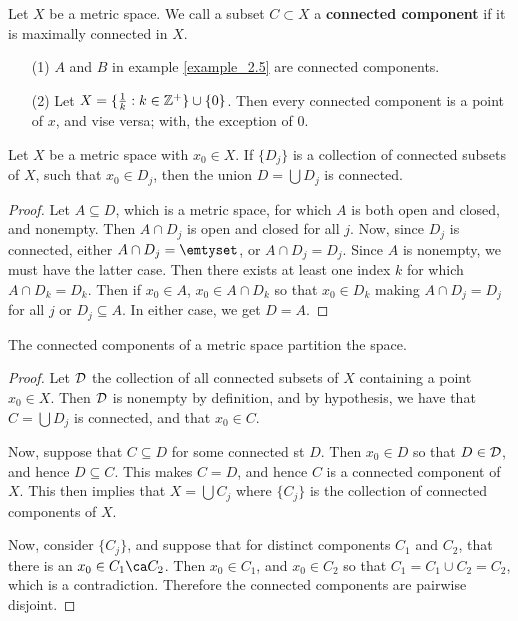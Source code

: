 \begin{definition}
    Let $X$ be a metric space. We call a subset  $C \subset X$ a
    \textbf{connected component} if it is maximally connected in $X$.
\end{definition}

\begin{example}\label{example_2.6}
    \begin{enumerate}
        \item[(1)] $A$ and  $B$ in example \ref{example_2.5} are connected
            components.

        \item[(2)] Let $X=\{\frac{1}{k} : k \in \mathbb{Z}^+\} \cup \{0\}$. Then every
            connected component is a point of $x$, and vise versa; with, the
            exception of $0$.
    \end{enumerate}
\end{example}

\begin{lemma}\label{2.2.4}
    Let $X$ be a metric space with  $x_0 \in X$. If $\{D_j\}$ is a collection of
    connected subsets of $X$, such that  $x_0 \in D_j$, then the union
    $D=\bigcup{D_j}$ is connected.
\end{lemma}
\begin{proof}
    Let $A \subseteq D$, which is a metric space, for which  $A$ is both open
    and closed, and nonempty. Then  $A \cap D_j$ is open and closed for all
    $j$. Now, since  $D_j$ is connected, either  $A \cap D_j=\emtyset$, or  $A
    \cap D_j=D_j$. Since  $A$ is nonempty, we must have the latter case. Then
    there exists at least one index $k$ for which $A \cap D_k=D_k$. Then if
    $x_0 \in A$, $x_0 \in A \cap D_k$ so that $x_0 \in D_k$ making $A \cap
    D_j=D_j$ for all  $j$ or  $D_j \subseteq A$. In either case, we get  $D=A$.
\end{proof}

\begin{theorem}\label{2.2.5}
    The connected components of a metric space partition the space.
\end{theorem}
\begin{proof}
    Let $\mathcal{D}$ the collection of all connected subsets of  $X$ containing a point
     $x_0 \in X$. Then $\mathcal{D}$ is nonempty by definition, and by hypothesis, we
     have that  $C=\bigcup{D_j}$ is connected, and that $x_0 \in C$.

     Now, suppose that $C \subseteq D$ for some connected st $D$. Then  $x_0 \in
     D$ so that $D \in \mathcal{D}$, and hence $D \subseteq C$. This makes $C=D$, and
     hence  $C$ is a connected component of  $X$. This then implies that
     $X=\bigcup{C_j}$ where $\{C_j\}$ is the collection of connected components
     of $X$.

     Now, consider  $\{C_j\}$, and suppose that for distinct components $C_1$
     and $C_2$, that there is an $x_0 \in C_1 \ca C_2$. Then $x_0 \in C_1$, and
     $x_0 \in C_2$ so that $C_1=C_1 \cup C_2=C_2$, which is a contradiction.
     Therefore the connected components are pairwise disjoint.
\end{proof}

